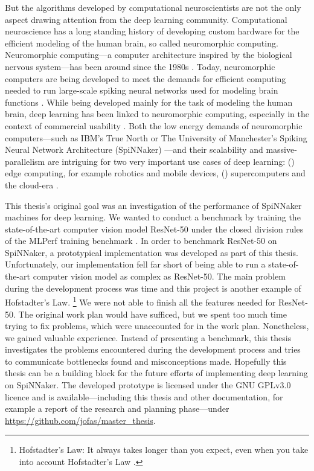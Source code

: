 \documentclass[]{article}
\begin{document}
But the algorithms developed by computational neuroscientists are not
the only aspect drawing attention from the deep learning community.
Computational neuroscience has a long standing history of
developing custom hardware for the efficient modeling of the human
brain, so called neuromorphic computing. Neuromorphic computing---a
computer architecture inspired by the biological nervous system---has
been around since the 1980s \citep{mead_1989}.
Today, neuromorphic computers are being developed to meet the
demands for efficient computing needed to run large-scale
spiking neural networks used for modeling brain
functions \citep{furber_2016}.
While being developed mainly for the task of modeling the human brain,
deep learning has been linked to neuromorphic computing,
especially in the context of commercial usability \citep{gomes_2017}.
Both the low energy demands of neuromorphic computers---such as IBM's
True North \citep{cassidy_et_al_2013} or The University of
Manchester's Spiking Neural Network Architecture (SpiNNaker)
\citep{furber_et_al_2006}---and their
scalability and massive-parallelism are intriguing for two very
important use cases of deep learning:
() edge computing, for example robotics
and mobile devices, () supercomputers and the
cloud-era \citep{gomes_2017}.

This thesis's original goal was an investigation of the performance of
SpiNNaker machines for deep learning.
We wanted to conduct a benchmark by training the state-of-the-art
computer vision model ResNet-50 \citep{he_et_al_2015} under the closed
division rules of the MLPerf training benchmark
\citep{mattson_et_al_2019}.
In order to benchmark ResNet-50 on SpiNNaker, a prototypical
implementation was developed as part of this thesis.
Unfortunately, our implementation fell far short of being able to
run a state-of-the-art computer vision model as complex as ResNet-50.
The main problem during the development process was time and this
project is another example of Hofstadter's Law.%
\footnote{%
  Hofstadter's Law: It always takes longer than you expect, even when
  you take into account Hofstadter's Law \citep{hofstadter_1979}.
}
We were not able to finish all the features needed for ResNet-50.
The original work plan would have sufficed, but we spent too much time
trying to fix problems, which were unaccounted for in the work plan.
Nonetheless, we gained valuable experience.
Instead of presenting a benchmark, this thesis investigates the
problems encountered during the development process and tries to
communicate bottlenecks found and misconceptions made.
Hopefully this thesis can be a building block for the future efforts
of implementing deep learning on SpiNNaker.
The developed prototype is licensed under the GNU GPLv3.0 licence and
is available---including this thesis and other documentation, for
example a report of the research and planning phase---under
\url{https://github.com/jofas/master_thesis}.
\end{document}
